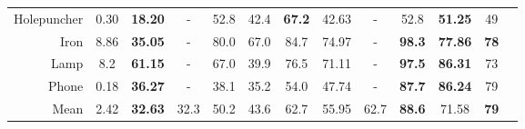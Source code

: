 {{\begin{table*}[t]
\begin{adjustbox}{max width=\textwidth}
\begin{tabular}{r|cc|ccccccc|ccc}
			Holepuncher & 0.30 &\textbf{18.20}& -& 	52.8& 42.4& \textbf{67.2}& 42.63   & -& 52.8 & \textbf{51.25}&49\\
			Iron & 8.86 &\textbf{35.05} &       -& 	80.0& 67.0& 84.7& 74.97   & -& \textbf{98.3} & \textbf{77.86}&\textbf{78}\\
			Lamp & 8.2 & \textbf{61.15} &       -& 	67.0& 39.9& 76.5& 71.11   & -& \textbf{97.5} & \textbf{86.31}&73\\
			Phone & 0.18 &\textbf{36.27} &      -& 	38.1& 35.2& 54.0& 47.74   & -& \textbf{87.7} & \textbf{86.24}&79\\
			\midrule
			Mean &  2.42& \textbf{32.63}  & 32.3   & 50.2 & 43.6& 62.7 & 55.95  & 62.7 & \textbf{88.6} & 71.58 & \textbf{79}
		\end{tabular}
	\end{adjustbox}
	\label{tab:linemod}
\end{table*}



\begin{figure*}
	\captionsetup{width=0.8\textwidth}
\end{figure*}}}
